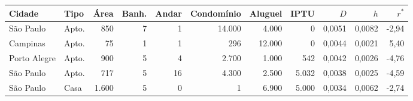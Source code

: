 \begin{tabular}{llrrrrrrrrr}
\toprule
Cidade & Tipo & Área & Banh. & Andar & Condomínio & Aluguel & IPTU & $D$ & $h$ & $r^*$ \\
\midrule
São Paulo & Apto. & 850 & 7 & 1 & 14.000 & 4.000 & 0 & 0,0051 & 0,0082 & -2,94 \\
Campinas & Apto. & 75 & 1 & 1 & 296 & 12.000 & 0 & 0,0044 & 0,0021 & 5,40 \\
Porto Alegre & Apto. & 900 & 5 & 4 & 2.700 & 1.000 & 542 & 0,0042 & 0,0026 & -4,76 \\
São Paulo & Apto. & 717 & 5 & 16 & 4.300 & 2.500 & 5.032 & 0,0038 & 0,0025 & -4,59 \\
São Paulo & Casa & 1.600 & 5 & 0 & 1 & 6.900 & 5.000 & 0,0034 & 0,0062 & -2,74 \\
\bottomrule
\end{tabular}
